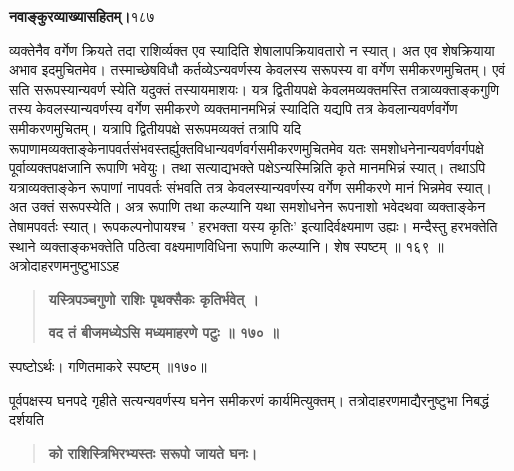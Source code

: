\documentclass[11pt, openany]{book}
\begin{document}
\thispagestyle{empty}
\newpage

\onehalfspacing
\hspace{2in}\textbf{नवाङ्कुरव्याख्यासहितम्।}\hspace{2in}१८७

\vspace{5mm}

\begin{sloppypar}
\hangindent=0.2in व्यक्तेनैव वर्गेण क्रियते तदा राशिर्व्यक्त एव स्यादिति शेषालापक्रियावतारो न स्यात्। अत एव शेषक्रियाया अभाव इदमुचितमेव। तस्माच्छेषविधौ कर्तव्येऽन्यवर्णस्य केवलस्य सरूपस्य वा वर्गेण समीकरणमुचितम्। एवं सति सरूपस्यान्यवर्ण स्येति यदुक्तं तस्यायमाशयः। यत्र द्वितीयपक्षे केवलमव्यक्तमस्ति तत्राव्यक्ताङ्कगुणि तस्य केवलस्यान्यवर्णस्य वर्गेण समीकरणे व्यक्तमानमभिन्नं स्यादिति यद्यपि तत्र केवलान्यवर्णवर्गेण समीकरणमुचितम्। यत्रापि द्वितीयपक्षे सरूपमव्यक्तं तत्रापि यदि रूपाणामव्यक्ताङ्केनापवर्तसंभवस्तर्ह्युक्तविधान्यवर्णवर्गसमीकरणमुचितमेव यतः समशोधनेनान्यवर्णवर्गपक्षे पूर्वाव्यक्तपक्षजानि रूपाणि भवेयुः। तथा सत्याद्यभक्ते पक्षेऽन्यस्मिन्निति कृते मानमभिन्नं स्यात्। तथाऽपि यत्राव्यक्ताङ्केन रूपाणां नापवर्तः संभवति तत्र केवलस्यान्यवर्णस्य वर्गेण समीकरणे मानं भिन्नमेव स्यात्। अत उक्तं सरूपस्येति। अत्र रूपाणि तथा कल्प्यानि यथा समशोधनेन रूपनाशो भवेदथवा व्यक्ताङ्केन तेषामपवर्तः स्यात्। रूपकल्पनोपायश्च ' हरभक्ता यस्य कृतिः' इत्यादिर्वक्ष्यमाण उह्यः। मन्दैस्तु हरभक्तेति स्थाने व्यक्ताङ्कभक्तेति पठित्वा वक्ष्यमाणविधिना रूपाणि कल्प्यानि। शेष स्पष्टम् ॥ १६९ ॥\\

\hangindent=0.2in \hspace{0.2in}अत्रोदाहरणमनुष्टुभाऽऽह\textendash

\begin{quote}
\hspace{1in}\textbf{यस्त्रिपञ्चगुणो राशिः पृथक्सैकः कृतिर्भवेत् ।}

\hspace{1in}\textbf{वद तं बीजमध्येऽसि मध्यमाहरणे पटुः ॥ १७० ॥}
\end{quote}

\hangindent=0.2in \hspace{0.2in}स्पष्टोऽर्थः। गणितमाकरे स्पष्टम् ॥१७०॥

\hangindent=0.2in \hspace{0.2in}पूर्वपक्षस्य घनपदे गृहीते सत्यन्यवर्णस्य घनेन समीकरणं कार्यमित्युक्तम्। तत्रोदाहरणमाद्यैरनुष्टुभा निबद्धं दर्शयति\textendash

\begin{quote}
\hspace{1in}\textbf{को राशिस्त्रिभिरभ्यस्तः सरूपो जायते घनः।}


\end{quote}
\end{sloppypar}
\end{document}
